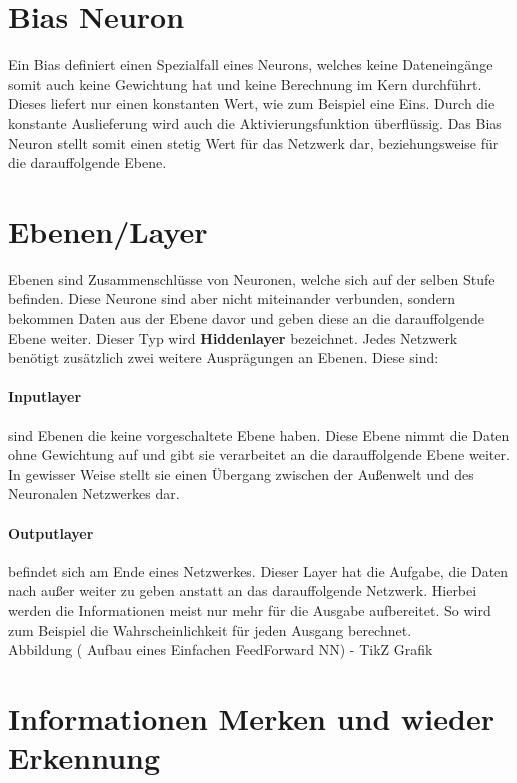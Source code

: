 \section{Bias Neuron}
\label{sec:Bias Neuron}

Ein Bias definiert einen Spezialfall eines Neurons, welches keine Dateneingänge somit auch keine Gewichtung hat und keine Berechnung im Kern durchführt. 
Dieses liefert nur einen konstanten Wert, wie zum Beispiel eine Eins. 
Durch die konstante Auslieferung wird auch die Aktivierungsfunktion überflüssig. 
Das Bias Neuron stellt somit einen stetig Wert für das Netzwerk dar, beziehungsweise für die darauffolgende Ebene.

\section{Ebenen/Layer}
\label{sec:Layer}

Ebenen sind Zusammenschlüsse von Neuronen, welche sich auf der selben Stufe befinden. 
Diese Neurone sind aber nicht miteinander verbunden, sondern bekommen Daten aus der Ebene davor und geben diese an die darauffolgende Ebene weiter. 
Dieser Typ wird \textbf{Hiddenlayer} bezeichnet. 
Jedes Netzwerk benötigt zusätzlich zwei weitere Ausprägungen an Ebenen. 
Diese sind:

\paragraph{Inputlayer} sind Ebenen die keine vorgeschaltete Ebene haben. 
Diese Ebene nimmt die Daten ohne Gewichtung auf und gibt sie verarbeitet an die darauffolgende Ebene weiter. 
In gewisser Weise stellt sie einen Übergang zwischen der Außenwelt und des Neuronalen Netzwerkes dar.

\paragraph{Outputlayer} befindet sich am Ende eines Netzwerkes. 
Dieser Layer hat die Aufgabe, die Daten nach außer weiter zu geben anstatt an das darauffolgende Netzwerk. 
Hierbei werden die Informationen meist nur mehr für die Ausgabe aufbereitet. 
So wird zum Beispiel die Wahrscheinlichkeit für jeden Ausgang berechnet.
\\

Abbildung ( Aufbau eines Einfachen FeedForward NN) - TikZ Grafik

\section{Informationen Merken und wieder Erkennung}

